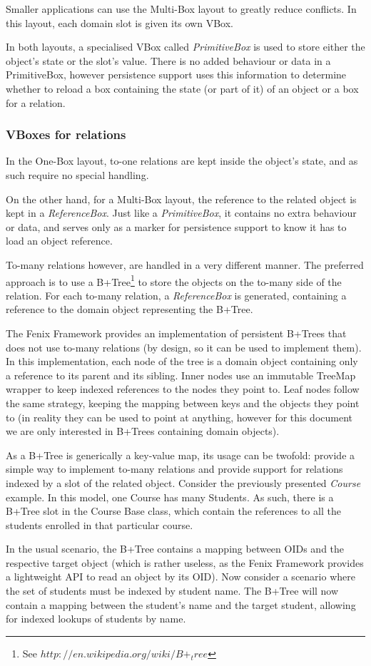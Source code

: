 Smaller applications can use the Multi-Box layout to greatly reduce
conflicts. In this layout, each domain slot is given its own VBox.

In both layouts, a specialised VBox called {\it PrimitiveBox} is
used to store either the object's state or the slot's value. There is
no added behaviour or data in a PrimitiveBox, however persistence
support uses this information to determine whether to reload a box
containing the state (or part of it) of an object or a box for a relation.

\subsubsection{VBoxes for relations}

In the One-Box layout, to-one relations are kept inside the object's
state, and as such require no special handling. 

On the other hand, for a Multi-Box layout, the reference to the
related object is kept in a {\it ReferenceBox}. Just like a {\it
  PrimitiveBox}, it contains no extra behaviour or data, and serves
only as a marker for persistence support to know it has to load an
object reference.

To-many relations however, are handled in a very different manner. The
preferred approach is to use a B+Tree\footnote{See
  $http://en.wikipedia.org/wiki/B+_tree$} to store the objects on the
to-many side of the relation. For each to-many relation, a {\it
  ReferenceBox} is generated, containing a reference to the domain
object representing the B+Tree.

The Fenix Framework provides an implementation of persistent B+Trees
that does not use to-many relations (by design, so it can be used to
implement them). In this implementation, each node of the tree is a
domain object containing only a reference to its parent and its
sibling. Inner nodes use an immutable TreeMap wrapper to keep indexed
references to the nodes they point to. Leaf nodes follow the same
strategy, keeping the mapping between keys and the objects they point
to (in reality they can be used to point at anything, however for this
document we are only interested in B+Trees containing domain objects).

As a B+Tree is generically a key-value map, its usage can be twofold:
provide a simple way to implement to-many relations and provide
support for relations indexed by a slot of the related
object. Consider the previously presented {\it Course} example. In
this model, one Course has many Students. As such, there is a B+Tree
slot in the Course Base class, which contain the references to all the
students enrolled in that particular course.

In the usual scenario, the B+Tree contains a mapping between OIDs and
the respective target object (which is rather useless, as the Fenix
Framework provides a lightweight API to read an object by its OID).
Now consider a scenario where the set of students must be indexed by
student name. The B+Tree will now contain a mapping between the
student's name and the target student, allowing for indexed lookups of
students by name.

